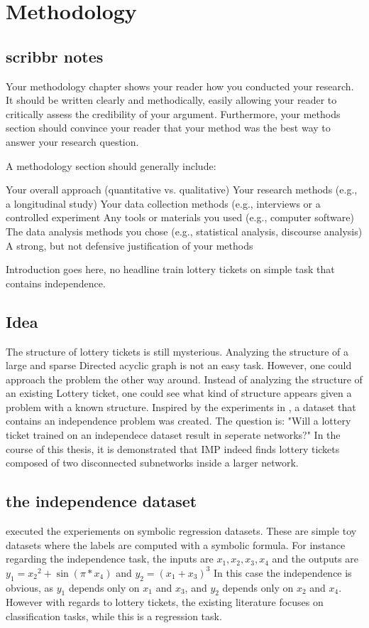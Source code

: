 \section{Methodology}
\subsection{scribbr notes}
Your methodology chapter shows your reader how you conducted your research. It should be written clearly and methodically, easily allowing your reader to critically assess the credibility of your argument. Furthermore, your methods section should convince your reader that your method was the best way to answer your research question.

A methodology section should generally include:

    Your overall approach (quantitative vs. qualitative)
    Your research methods (e.g., a longitudinal study)
    Your data collection methods (e.g., interviews or a controlled experiment
    Any tools or materials you used (e.g., computer software)
    The data analysis methods you chose (e.g., statistical analysis, discourse analysis)
    A strong, but not defensive justification of your methods



Introduction goes here, no headline
train lottery tickets on simple task that contains independence.
\subsection{Idea}
The structure of lottery tickets is still mysterious. 
Analyzing the structure of a large and sparse Directed acyclic graph is not an easy task. 
However, one could approach the problem the other way around. 
Instead of analyzing the structure of an existing Lottery ticket, one could see what kind of structure appears given a problem with a known structure.
Inspired by the experiments in \autocite{BIMT}, a dataset that contains an independence problem was created.
The question is:
"Will a lottery ticket trained on an independece dataset result in seperate networks?"
In the course of this thesis, it is demonstrated that IMP indeed finds lottery tickets composed of two disconnected subnetworks inside a larger network.
\subsection{the independence dataset}
\textcite{BIMT} executed the experiements on symbolic regression datasets.
These are simple toy datasets where the labels are computed with a symbolic formula. 
For instance regarding the independence task, the inputs are $x_1, x_2, x_3, x_4$ and the outputs are $y_1={x_2}^2 + \sin{(\pi*x_4)}$ and $y_2=(x_1+x_3)^3$
In this case the independence is obvious, as $y_1$ depends only on $x_1$ and $x_3$, and $y_2$ depends only on $x_2$ and $x_4$.
However with regards to lottery tickets, the existing literature focuses on classification tasks, while this is a regression task.

